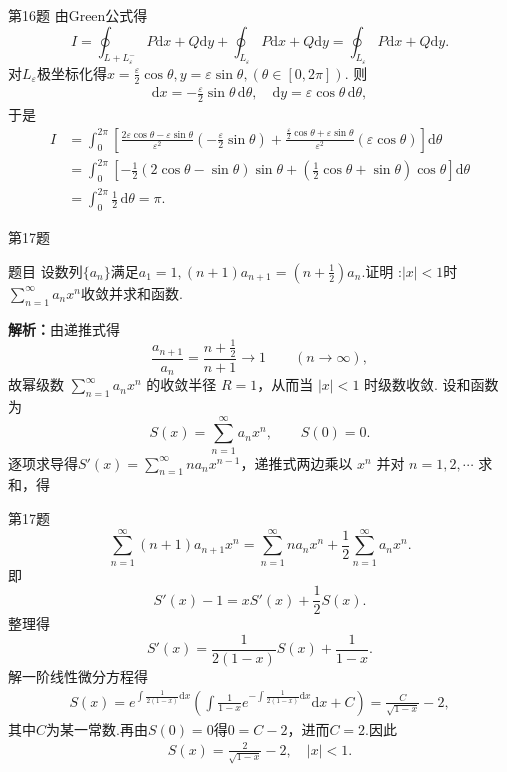\documentclass[aspectratio=169]{beamer}
\begin{document}
\begin{frame}{第16题}
由Green公式得
\[
I=\oint_{L+L_{\varepsilon}^{-}}{P\mathrm{d}x+Q\mathrm{d}y}+\oint_{L_{\varepsilon}}{P\mathrm{d}x+Q\mathrm{d}y}=\oint_{L_{\varepsilon}}{P\mathrm{d}x+Q\mathrm{d}y}.
\]
对$L_\varepsilon$极坐标化得$x=\frac{\varepsilon}{2}\cos\theta, y=\varepsilon\sin\theta,(\theta\in[0,2\pi]).$
则
\begin{align*}
\mathrm{d}x=-\frac{\varepsilon}{2}\sin\theta\,\mathrm{d}\theta,\quad
\mathrm{d}y=\varepsilon\cos\theta\,\mathrm{d}\theta,
\end{align*}
于是
\begin{align*}
I&=\int_0^{2\pi}
\left[
\frac{2\varepsilon\cos\theta-\varepsilon\sin\theta}{\varepsilon^2}
\left(-\frac{\varepsilon}{2}\sin\theta\right)
+\frac{\frac{\varepsilon}{2}\cos\theta+\varepsilon\sin\theta}{\varepsilon^2}
\left(\varepsilon\cos\theta\right)
\right]\mathrm{d}\theta\\
&=\int_0^{2\pi}
\left[
-\frac12(2\cos\theta-\sin\theta)\sin\theta
+\left(\frac12\cos\theta+\sin\theta\right)\cos\theta
\right]\mathrm{d}\theta\\
&=\int_0^{2\pi}\frac12\,\mathrm{d}\theta=\pi.
\end{align*}
\end{frame}

\begin{frame}{第17题}
\begin{block}{题目}
设数列$\{a_n\}$满足$a_1=1,(n+1)a_{n+1}=\left(n+\frac12\right)a_n$.证明 :$|x|<1$时$\sum_{n=1}^{\infty} a_n x^n$收敛并求和函数.
\end{block}
\textbf{解析：}由递推式得
\[
\frac{a_{n+1}}{a_n}=\frac{n+\frac12}{n+1}\to 1\qquad(n\to\infty),
\]
故幂级数 $\sum_{n=1}^{\infty} a_nx^n$ 的收敛半径 $R=1$，从而当 $|x|<1$ 时级数收敛.
设和函数为
\[
S(x)=\sum_{n=1}^{\infty}a_nx^n,\qquad S(0)=0.
\]
逐项求导得$S'(x)=\sum_{n=1}^{\infty}na_nx^{n-1}$，递推式两边乘以 $x^n$ 并对 $n=1,2,\cdots$ 求和，得
\end{frame}

\begin{frame}{第17题}
\[
\sum_{n=1}^{\infty}(n+1)a_{n+1}x^n
=\sum_{n=1}^{\infty}na_nx^n+\frac12\sum_{n=1}^{\infty}a_nx^n.
\]
即
\[
S'(x)-1=xS'(x)+\frac12S(x).
\]
整理得
\[
S'(x)=\frac{1}{2(1-x)}S(x)+\frac{1}{1-x}.
\]
解一阶线性微分方程得
\begin{align*}
S\left( x \right) =e^{\int{\frac{1}{2\left( 1-x \right)}\mathrm{d}x}}\left( \int{\frac{1}{1-x}e^{-\int{\frac{1}{2\left( 1-x \right)}\mathrm{d}x}}\mathrm{d}x}+C \right) 
=\frac{C}{\sqrt{1-x}}-2,
\end{align*}
其中$C$为某一常数.再由$S(0)=0$得$0=C-2$，进而$ C=2.$因此
\begin{align*}
S(x)=\frac{2}{\sqrt{1-x}}-2,\quad |x|<1.
\end{align*}
\end{frame}
\end{document}
